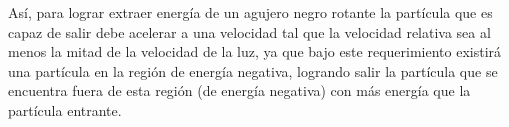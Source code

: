 Así, para lograr extraer energía de un agujero negro rotante la partícula que es capaz de salir debe acelerar a una velocidad tal que la velocidad relativa sea al menos la mitad de la velocidad de la luz, ya que bajo este requerimiento existirá una partícula en la región de energía negativa, logrando salir la partícula que se encuentra fuera de esta región (de energía negativa) con más energía que la partícula entrante.\\


